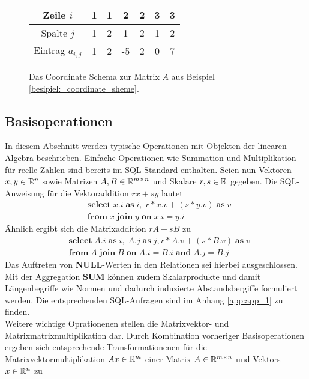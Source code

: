 \begin{figure}[h]
    \label{coordinate_scheme_table}
    \centering
    \begin{tabular}{ |c|c|c|c|c|c|c| } 
     \hline
     Zeile $i$ &1 &1 &2 &2 &3 &3 \\ 
     \hline
     Spalte $j$ &1 &2 &1 &2 &1 &2 \\ 
     \hline
     Eintrag $a_{i,j}$ &1 &2 &-5 &2 &0 &7 \\ 
     \hline
    \end{tabular}
    \caption{Das Coordinate Schema zur Matrix $A$ aus Beispiel \ref{besipiel:_coordinate_sheme}.}
\end{figure}



\subsection{Basisoperationen}
\label{abs_basisoperationen}
In diesem Abschnitt werden typische Operationen mit Objekten der linearen Algebra beschrieben. Einfache Operationen wie Summation und Multiplikation für reelle Zahlen sind bereits im SQL-Standard enthalten. Seien nun Vektoren $x,y \in \mathbb{R}^n$ sowie Matrizen $A,B \in \mathbb{R}^{m \times n}$ und Skalare $r,s \in \mathbb{R}$ gegeben. Die SQL-Anweisung für die Vektoraddition $rx+sy$ lautet
\begin{align*}
    & \mathbf{select} \; x.i \; \mathbf{as} \; i, \; r*x.v+(s*y.v ) \; \mathbf{as} \; v \\
    & \mathbf{from} \; x \; \mathbf{join} \; y \; \mathbf{on} \; x.i=y.i
\end{align*}
Ähnlich ergibt sich die Matrixaddition $rA+sB$ zu
\begin{align*}
    & \mathbf{select} \; A.i \; \mathbf{as} \; i, \; A.j \; \mathbf{as} \; j, r*A.v+(s*B.v ) \; \mathbf{as} \; v \\
    & \mathbf{from} \; A \; \mathbf{join} \; B \; \mathbf{on} \; A.i=B.i \; \mathbf{and} \; A.j=B.j
\end{align*}
Das Auftreten von \textbf{NULL}-Werten in den Relationen sei hierbei ausgeschlossen. 
Mit der Aggregation \textbf{SUM} können zudem Skalarprodukte und damit Längenbegriffe wie Normen und dadurch induzierte Abstandsbergiffe formuliert werden. Die entsprechenden SQL-Anfragen  sind im Anhang \ref{app:app_1} zu finden. \\
Weitere wichtige Oprationenen stellen die Matrixvektor- und Matrixmatrixmultiplikation dar. 
Durch Kombination vorheriger Basisoperationen ergeben sich entsprechende Transformationenen für die Matrixvektormultiplikation $Ax \in \mathbb{R}^m$ einer Matrix $A \in \mathbb{R}^{m \times n}$ und Vektors $x \in \mathbb{R}^n$ zu

